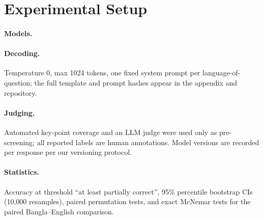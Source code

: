 \section{Experimental Setup}
\label{sec:setup}

\paragraph{Models.} 

\paragraph{Decoding.} Temperature 0, max 1024 tokens, one fixed system prompt
per language-of-question; the full template and prompt hashes appear in the
appendix and repository.

\paragraph{Judging.} Automated key-point coverage and an LLM judge were used
only as pre-screening; all reported labels are human annotations. Model
versions are recorded per response per our versioning protocol.

\paragraph{Statistics.} Accuracy at threshold ``at least partially correct'',
95\% percentile bootstrap CIs (10{,}000 resamples), paired permutation tests,
and exact McNemar tests for the paired Bangla--English comparison.
